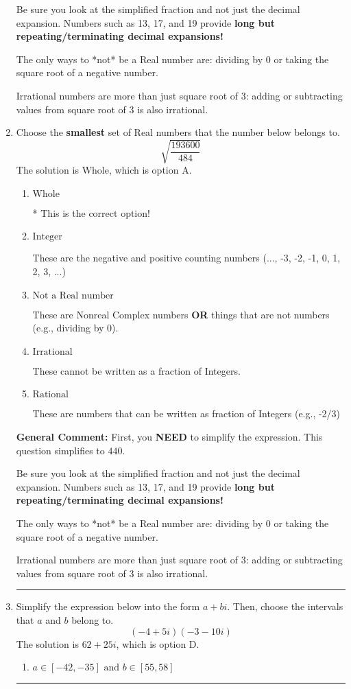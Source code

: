\documentclass{extbook}[14pt]
\newcommand{\litem}[1]{\item #1

\rule{\textwidth}{0.4pt}}
\begin{document}
\begin{enumerate}
{ Be sure you look at the simplified fraction and not just the decimal expansion. Numbers such as 13, 17, and 19 provide \textbf{long but repeating/terminating decimal expansions!} 
 
 The only ways to *not* be a Real number are: dividing by 0 or taking the square root of a negative number. 
 
 Irrational numbers are more than just square root of 3: adding or subtracting values from square root of 3 is also irrational.
}
\litem{
Choose the \textbf{smallest} set of Real numbers that the number below belongs to.
\[ \sqrt{\frac{193600}{484}} \]The solution is \( \text{Whole} \), which is option A.\begin{enumerate}[label=\Alph*.]
\item \( \text{Whole} \)

* This is the correct option!
\item \( \text{Integer} \)

These are the negative and positive counting numbers (..., -3, -2, -1, 0, 1, 2, 3, ...)
\item \( \text{Not a Real number} \)

These are Nonreal Complex numbers \textbf{OR} things that are not numbers (e.g., dividing by 0).
\item \( \text{Irrational} \)

These cannot be written as a fraction of Integers.
\item \( \text{Rational} \)

These are numbers that can be written as fraction of Integers (e.g., -2/3)
\end{enumerate}

\textbf{General Comment:} First, you \textbf{NEED} to simplify the expression. This question simplifies to $440$. 
 
 Be sure you look at the simplified fraction and not just the decimal expansion. Numbers such as 13, 17, and 19 provide \textbf{long but repeating/terminating decimal expansions!} 
 
 The only ways to *not* be a Real number are: dividing by 0 or taking the square root of a negative number. 
 
 Irrational numbers are more than just square root of 3: adding or subtracting values from square root of 3 is also irrational.
}
\litem{
Simplify the expression below into the form $a+bi$. Then, choose the intervals that $a$ and $b$ belong to.
\[ (-4 + 5 i)(-3 - 10 i) \]The solution is \( 62 + 25 i \), which is option D.\begin{enumerate}[label=\Alph*.]
\item \( a \in [-42, -35] \text{ and } b \in [55, 58] \)


\end{enumerate}}
\end{enumerate}
\end{document}
